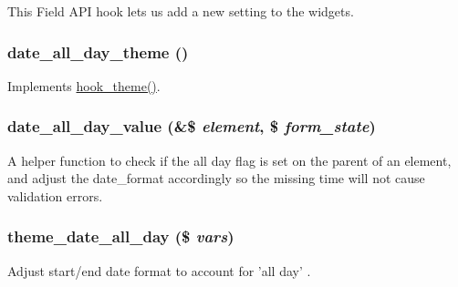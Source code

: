 This Field API hook lets us add a new setting to the widgets. \hypertarget{date__all__day_8module_a7edcfcaf78ee4f273c521bd634b31d7b}{
\subsubsection[{date\_\-all\_\-day\_\-theme}]{\setlength{\rightskip}{0pt plus 5cm}date\_\-all\_\-day\_\-theme ()}}
\label{date__all__day_8module_a7edcfcaf78ee4f273c521bd634b31d7b}
Implements \hyperlink{group__hooks_ga013ccb45c7aaab1c16cf9691428c910d}{hook\_\-theme()}. \hypertarget{date__all__day_8module_a1856ce458f79c00e45a3b662789279ac}{
\subsubsection[{date\_\-all\_\-day\_\-value}]{\setlength{\rightskip}{0pt plus 5cm}date\_\-all\_\-day\_\-value (\&\$ {\em element}, \/  \$ {\em form\_\-state})}}
\label{date__all__day_8module_a1856ce458f79c00e45a3b662789279ac}
A helper function to check if the all day flag is set on the parent of an element, and adjust the date\_\-format accordingly so the missing time will not cause validation errors. \hypertarget{date__all__day_8module_a03048bd6261e056d3ac6f15fb223a0e0}{
\subsubsection[{theme\_\-date\_\-all\_\-day}]{\setlength{\rightskip}{0pt plus 5cm}theme\_\-date\_\-all\_\-day (\$ {\em vars})}}
\label{date__all__day_8module_a03048bd6261e056d3ac6f15fb223a0e0}
Adjust start/end date format to account for 'all day' .


